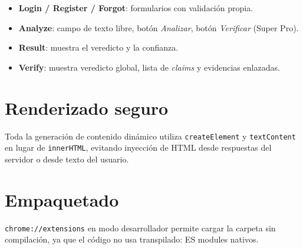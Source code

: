\begin{itemize}[leftmargin=*,itemsep=0.2em]
  \item \textbf{Login / Register / Forgot}: formularios con validación
        propia.
  \item \textbf{Analyze}: campo de texto libre, botón
        \emph{Analizar}, botón \emph{Verificar} (Super Pro).
  \item \textbf{Result}: muestra el veredicto y la confianza.
  \item \textbf{Verify}: muestra veredicto global, lista de
        \emph{claims} y evidencias enlazadas.
\end{itemize}

\section{Renderizado seguro}

Toda la generación de contenido dinámico utiliza \texttt{createElement}
y \texttt{textContent} en lugar de \texttt{innerHTML}, evitando
inyección de HTML desde respuestas del servidor o desde texto del
usuario.

\section{Empaquetado}

\texttt{chrome://extensions} en modo desarrollador permite cargar la
carpeta  sin compilación, ya que el código no
usa transpilado: ES modules nativos.
